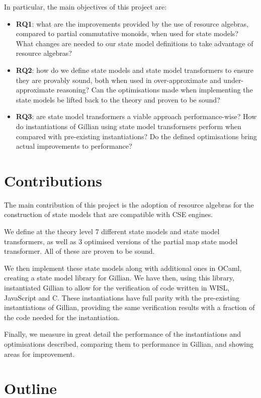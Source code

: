 In particular, the main objectives of this project are: \begin{itemize}
	\item \textbf{RQ1}: what are the improvements provided by the use of resource algebras, compared to partial commutative monoids, when used for state models? What changes are needed to our state model definitions to take advantage of resource algebras?
	\item \textbf{RQ2}: how do we define state models and state model transformers to ensure they are provably sound, both when used in over-approximate and under-approximate reasoning? Can the optimisations made when implementing the state models be lifted back to the theory and proven to be sound?
	\item \textbf{RQ3}: are state model transformers a viable approach performance-wise? How do instantiations of Gillian using state model transformers perform when compared with pre-existing instantiations? Do the defined optimisations bring actual improvements to performance?
\end{itemize}

\section{Contributions}

The main contribution of this project is the adoption of resource algebras for the construction of state models that are compatible with CSE engines.

We define at the theory level 7 different state models and state model transformers, as well as 3 optimised versions of the partial map state model transformer. All of these are proven to be sound.

We then implement these state models along with additional ones in OCaml, creating a state model library for Gillian. We have then, using this library, instantiated Gillian to allow for the verification of code written in WISL, JavaScript and C. These instantiations have full parity with the pre-existing instantiations of Gillian, providing the same verification results with a fraction of the code needed for the instantiation.

Finally, we measure in great detail the performance of the instantiations and optimisations described, comparing them to performance in Gillian, and showing areas for improvement.

\section{Outline}

